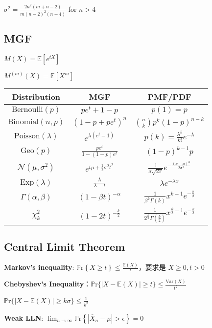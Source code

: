 \documentclass[9pt,landscape]{article}
\begin{document}
\begin{multicols}{3}
$\sigma^2=\frac{2n^2(m+n-2)}{m(n-2)^2(n-4)}$ for $n>4$

\subsection{MGF}

$M(X)=\mathbb{E}\left[e^{tX}\right]$

$M^{(m)}(X)=\mathbb{E}\left[X^m\right]$

\begin{tabular}{|c|c|c|}
\hline
\textbf{Distribution} & \textbf{MGF} & \textbf{PMF/PDF}\\ \hline
$\mathrm{Bernoulli}(p)$ & $pe^t + 1-p$ & $p(1)=p$ \\ \hline
$\mathrm{Binomial}(n, p)$ & $(1-p + pe^t)^n$&$\binom{n}{k}p^k(1-p)^{n-k}$\\ \hline
$\mathrm{Poisson}(\lambda)$ & $e^{\lambda(e^t - 1)}$ &$p(k)=\frac{\lambda^k}{k!}e^{-\lambda}$\\ \hline
$\mathrm{Geo}(p)$ & $\frac{pe^t}{1-(1-p)e^t}$ & $(1-p)^{k-1}p$ \\ \hline
$\mathcal{N}(\mu, \sigma^2)$ & $e^{t\mu + \frac{1}{2}\sigma^2 t^2}$ &$\frac{1}{\sigma\sqrt{2\pi}}e^{-\frac{(x-\mu)^2}{2\sigma^2}}$  \\ \hline
$\mathrm{Exp}(\lambda)$ & $\frac{\lambda}{\lambda - t}$ & $\lambda e^{-\lambda x}$ \\ \hline
$\Gamma(\alpha, \beta)$ & $(1 - \beta t)^{-\alpha}$ & $\frac{1}{\beta^k\Gamma(k)}x^{k-1}e^{-\frac{x}{\beta}}$ \\ \hline
$\chi^2_k$ & $(1 - 2t)^{-\frac{k}{2}}$ &$\frac{1}{2^{\frac{k}{2}}\Gamma\left(\frac{k}{2}\right)}x^{\frac{k}{2}-1}e^{-\frac{x}{2}}$\\ \hline
\end{tabular}

\subsection{Central Limit Theorem}

\textbf{Markov's inequality}: $\mathbb{P}\mathrm{r}\left\{X\ge t\right\}\le\frac{\mathbb{E}(X)}{t}$，要求是 $X\ge 0, t>0$

\textbf{Chebyshev's Inequality}：$\mathbb{P}\mathrm{r}\{|X-\mathbb{E}(X)|\ge t\}\le\frac{\mathrm{Var}(X)}{t^2}$

$\mathbb{P}\mathrm{r}\{|X-\mathbb{E}(X)|\ge k\sigma\}\le\frac{1}{k^2}$

\textbf{Weak LLN}: $\lim_{n\to\infty}\mathbb{P}\mathrm{r}\left\{\left|\overline{X}_n-\mu\right|>\epsilon\right\}=0$


\end{multicols}
\end{document}
